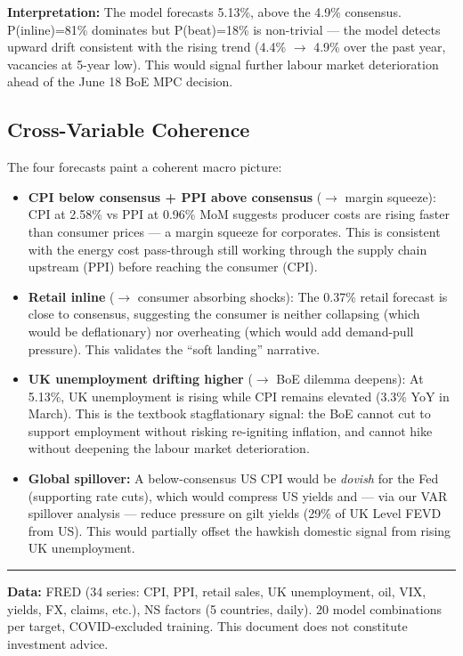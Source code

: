 \documentclass[11pt,a4paper]{article}
\begin{document}
\noindent\textbf{Interpretation:} The model forecasts 5.13\%, above the 4.9\% consensus. P(inline)=81\% dominates but P(beat)=18\% is non-trivial --- the model detects upward drift consistent with the rising trend (4.4\% $\rightarrow$ 4.9\% over the past year, vacancies at 5-year low). This would signal further labour market deterioration ahead of the June 18 BoE MPC decision.

\subsection*{Cross-Variable Coherence}

The four forecasts paint a coherent macro picture:

\begin{itemize}[nosep, leftmargin=1.2em]
    \item \textbf{CPI below consensus + PPI above consensus} ($\rightarrow$ margin squeeze): CPI at 2.58\% vs PPI at 0.96\% MoM suggests producer costs are rising faster than consumer prices --- a margin squeeze for corporates. This is consistent with the energy cost pass-through still working through the supply chain upstream (PPI) before reaching the consumer (CPI).
    \item \textbf{Retail inline} ($\rightarrow$ consumer absorbing shocks): The 0.37\% retail forecast is close to consensus, suggesting the consumer is neither collapsing (which would be deflationary) nor overheating (which would add demand-pull pressure). This validates the ``soft landing'' narrative.
    \item \textbf{UK unemployment drifting higher} ($\rightarrow$ BoE dilemma deepens): At 5.13\%, UK unemployment is rising while CPI remains elevated (3.3\% YoY in March). This is the textbook stagflationary signal: the BoE cannot cut to support employment without risking re-igniting inflation, and cannot hike without deepening the labour market deterioration.
    \item \textbf{Global spillover:} A below-consensus US CPI would be \textit{dovish} for the Fed (supporting rate cuts), which would compress US yields and --- via our VAR spillover analysis --- reduce pressure on gilt yields (29\% of UK Level FEVD from US). This would partially offset the hawkish domestic signal from rising UK unemployment.
\end{itemize}

\vspace{0.3cm}
\noindent\rule{\textwidth}{0.4pt}
{\footnotesize\color{biggrey} \textbf{Data:} FRED (34 series: CPI, PPI, retail sales, UK unemployment, oil, VIX, yields, FX, claims, etc.), NS factors (5 countries, daily). 20 model combinations per target, COVID-excluded training. This document does not constitute investment advice.}
\end{document}
